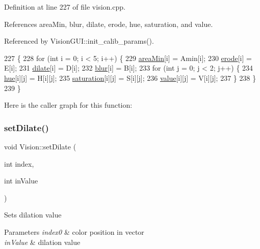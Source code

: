 Definition at line 227 of file vision.\+cpp.



References area\+Min, blur, dilate, erode, hue, saturation, and value.



Referenced by Vision\+G\+U\+I\+::init\+\_\+calib\+\_\+params().


\begin{DoxyCode}
227                                                                                                            
       \{
228     \textcolor{keywordflow}{for} (\textcolor{keywordtype}{int} i = 0; i < 5; i++) \{
229         \hyperlink{class_vision_a674b5bf7f6570f5b8e053ee28a9721ff}{areaMin}[i] = Amin[i];
230         \hyperlink{class_vision_a441302204181d31885b611e10ea92489}{erode}[i] = E[i];
231         \hyperlink{class_vision_a406af58255882218a4d49f41b7e3a67a}{dilate}[i] = D[i];
232         \hyperlink{class_vision_a48d1a64140429848f9a75a9d46c6e920}{blur}[i] = B[i];
233         \textcolor{keywordflow}{for} (\textcolor{keywordtype}{int} j = 0; j < 2; j++) \{
234             \hyperlink{class_vision_a557114ed93889df7c09fe7add7a2fa1f}{hue}[i][j] = H[i][j];
235             \hyperlink{class_vision_a71a7f9859283e916a0dfb1467eaf5b13}{saturation}[i][j] = S[i][j];
236             \hyperlink{class_vision_ad76f296d21c0758ed68429ca8b237b03}{value}[i][j] = V[i][j];
237         \}
238     \}
239 \}
\end{DoxyCode}
Here is the caller graph for this function\+:
\mbox{\label{class_vision_a5a763aa322837556ab83f39ffb7e9391}} 
\subsubsection{\texorpdfstring{set\+Dilate()}{setDilate()}}
{\footnotesize\ttfamily void Vision\+::set\+Dilate (\begin{DoxyParamCaption}\item[{int}]{index,  }\item[{int}]{in\+Value }\end{DoxyParamCaption})}

Sets dilation value 
\begin{DoxyParams}{Parameters}
{\em index0} & color position in vector \\
\hline
{\em in\+Value} & dilation value \\
\hline
\end{DoxyParams}



